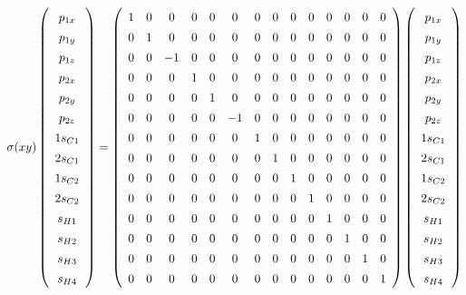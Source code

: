 \documentclass[9pt]{report}
\begin{document}
\scriptsize
\begin{equation}
\sigma(xy)
\renewcommand{\arraystretch}{1.4}
\left(\begin{array}{c} p_{1x}  \\  p_{1y}  \\  p_{1z}  \\  p_{2x}  \\ p_{2y} \\  p_{2z}  \\  1s_{C1}  \\  2s_{C1}  \\  1s_{C2}  \\  2s_{C2}  \\  s_{H1}  \\  s_{H2}  \\  s_{H3}  \\  s_{H4}   \\\end{array}\right)
=
\left(\begin{array}{cccccccccccccc}
1 & 0 & 0 & 0 & 0 & 0 & 0 & 0 & 0 & 0 & 0 & 0 & 0 & 0
\\
0 & 1 & 0 & 0 & 0 & 0 & 0 & 0 & 0 & 0 & 0 & 0 & 0 & 0
\\
0 & 0 & -1 & 0 & 0 & 0 & 0 & 0 & 0 & 0 & 0 & 0 & 0 & 0
\\
0 & 0 & 0 & 1 & 0 & 0 & 0 & 0 & 0 & 0 & 0 & 0 & 0 & 0
\\
0 & 0 & 0 & 0 & 1 & 0 & 0 & 0 & 0 & 0 & 0 & 0 & 0 & 0
\\
0 & 0 & 0 & 0 & 0 & -1 & 0 & 0 & 0 & 0 & 0 & 0 & 0 & 0
\\
0 & 0 & 0 & 0 & 0 & 0 & 1 & 0 & 0 & 0 & 0 & 0 & 0 & 0
\\
0 & 0 & 0 & 0 & 0 & 0 & 0 & 1 & 0 & 0 & 0 & 0 & 0 & 0
\\
0 & 0 & 0 & 0 & 0 & 0 & 0 & 0 & 1 & 0 & 0 & 0 & 0 & 0
\\
0 & 0 & 0 & 0 & 0 & 0 & 0 & 0 & 0 & 1 & 0 & 0 & 0 & 0
\\
0 & 0 & 0 & 0 & 0 & 0 & 0 & 0 & 0 & 0 & 1 & 0 & 0 & 0
\\
0 & 0 & 0 & 0 & 0 & 0 & 0 & 0 & 0 & 0 & 0 & 1 & 0 & 0
\\
0 & 0 & 0 & 0 & 0 & 0 & 0 & 0 & 0 & 0 & 0 & 0 & 1 & 0
\\
0 & 0 & 0 & 0 & 0 & 0 & 0 & 0 & 0 & 0 & 0 & 0 & 0 & 1
\\\end{array}\right)
\left(\begin{array}{c} p_{1x}  \\  p_{1y}  \\  p_{1z}  \\  p_{2x}  \\ p_{2y} \\  p_{2z}  \\  1s_{C1}  \\  2s_{C1}  \\  1s_{C2}  \\  2s_{C2}  \\  s_{H1}  \\  s_{H2}  \\  s_{H3}  \\  s_{H4}   \\\end{array}\right)
\end{equation}
\end{document}
